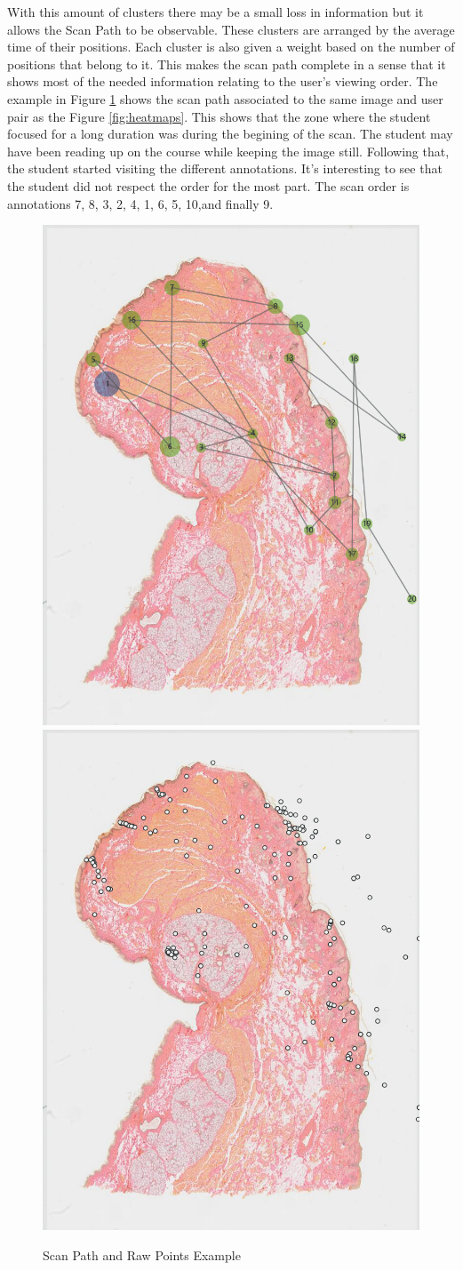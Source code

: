 \documentclass[a4paper,11pt]{report}
\numberwithin{figure}{chapter} %
\begin{document}
\begin{itemize}
        With this amount of clusters there may be a small loss in information but it allows the Scan Path to be observable.
        These clusters are arranged by the average time of their positions.
        Each cluster is also given a weight based on the number of positions that belong to it.
        This makes the scan path complete in a sense that it shows most of the needed information relating to the user's viewing order.
        The example in Figure \ref{fig:scanpath} shows the scan path associated to the same image and user pair as the Figure \ref{fig:heatmaps}.
        This shows that the zone where the student focused for a long duration was during the begining of the scan.
        The student may have been reading up on the course while keeping the image still.
        Following that, the student started visiting the different annotations.
        It's interesting to see that the student did not respect the order for the most part.
        The scan order is annotations 7, 8, 3, 2, 4, 1, 6, 5, 10,and finally 9.
          \begin{figure}[H]
          \centering
          \includegraphics[width=.3\linewidth]{images/5501147_scanpath.png} \includegraphics[width=.3\linewidth]{images/5501147_points.png}
          \caption{Scan Path and Raw Points Example}
          \label{fig:scanpath}
    \end{figure}
    \end{itemize}
\end{document}

